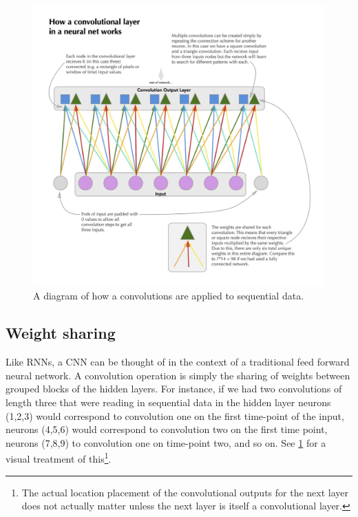 \documentclass[]{book}
\let\rmarkdownfootnote\footnote%
\def\footnote{\protect\rmarkdownfootnote}
\theoremstyle{definition}
\theoremstyle{definition}
\theoremstyle{definition}
\theoremstyle{remark}
\begin{document}
\begin{figure}

{\centering \includegraphics[width=1\linewidth]{figures/convolutional_explainer} 

}

\caption{A diagram of how a convolutions are applied to sequential data.}\label{fig:cnnexplain}
\end{figure}

\subsection{Weight sharing}\label{weight-sharing-1}

Like RNNs, a CNN can be thought of in the context of a traditional feed
forward neural network. A convolution operation is simply the sharing of
weights between grouped blocks of the hidden layers. For instance, if we
had two convolutions of length three that were reading in sequential
data in the hidden layer neurons (1,2,3) would correspond to convolution
one on the first time-point of the input, neurons (4,5,6) would
correspond to convolution two on the first time point, neurons (7,8,9)
to convolution one on time-point two, and so on. See
\ref{fig:cnnexplain} for a visual treatment of this\footnote{The actual
  location placement of the convolutional outputs for the next layer
  does not actually matter unless the next layer is itself a
  convolutional layer.}.
\end{document}
